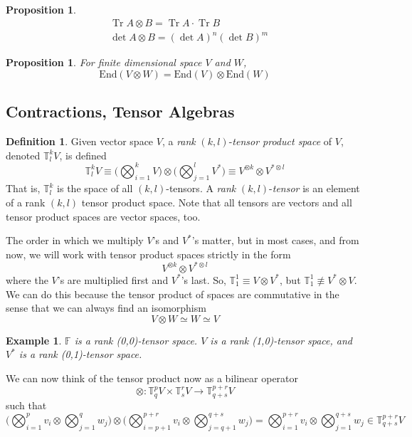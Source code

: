 \documentclass{article}
\DeclareMathOperator{\Tr}{Tr}
\newtheorem{proposition}[theorem]{Proposition}
\newtheorem{example}{Example}[section]
\theoremstyle{remark}
\theoremstyle{definition}
\newtheorem{definition}{Definition}[section]
\begin{document}
    \begin{proposition}
    \begin{align*}
        & \Tr{A \otimes B} = \Tr{A} \cdot \Tr{B} \\
        & \det{A \otimes B} = (\det{A})^n (\det{B})^m
    \end{align*}
    \end{proposition}

    \begin{proposition}
    For finite dimensional space $V$ and $W$, 
    \[\text{End}(V \otimes W) = \text{End}(V) \otimes \text{End}(W)\]
    \end{proposition}

  \subsection{Contractions, Tensor Algebras}

    \begin{definition}
    Given vector space $V$, a \textit{rank }$(k, l)$-\textit{tensor product space} of $V$, denoted $\mathbb{T}^{k}_{l} V$, is defined
    \[ \mathbb{T}^k_l V \equiv \bigg( \bigotimes_{i=1}^{k} V \bigg) \otimes \bigg( \bigotimes_{j=1}^{l} V^{*} \bigg) \equiv V^{\otimes k} \otimes V^{* \otimes l}\]
    That is, $\mathbb{T}^{k}_{l}$ is the space of all $(k, l)$-tensors. A \textit{rank }$(k, l)$-\textit{tensor} is an element of a rank $(k, l)$ tensor product space. Note that all tensors are vectors and all tensor product spaces are vector spaces, too. 

    The order in which we multiply $V$'s and $V^*$'s matter, but in most cases, and from now, we will work with tensor product spaces strictly in the form 
    \[ V^{\otimes k} \otimes V^{* \otimes l} \]
    where the $V$'s are multiplied first and $V^*$'s last. So, $\mathbb{T}^{1}_{1} \equiv V \otimes V^*$, but $\mathbb{T}^{1}_{1} \not\equiv V^* \otimes V$. We can do this because the tensor product of spaces are commutative in the sense that we can always find an isomorphism
    \[V \otimes W \simeq W \simeq V\]
    \end{definition}

    \begin{example}
    $\mathbb{F}$ is a rank (0,0)-tensor space. $V$ is a rank (1,0)-tensor space, and $V^{*}$ is a rank (0,1)-tensor space. 
    \end{example}

    We can now think of the tensor product now as a bilinear operator
    \[\otimes: \mathbb{T}^p_q V \times \mathbb{T}^r_s V \longrightarrow \mathbb{T}^{p+r}_{q+s} V\]
    such that
    \[\bigg( \bigotimes_{i=1}^p v_i \otimes \bigotimes_{j=1}^q w_j \bigg) \otimes \bigg( \bigotimes_{i = p+1}^{p+r} v_i \otimes \bigotimes_{j=q+1}^{q+s} w_j \bigg) = \bigotimes_{i=1}^{p+r} v_i \otimes \bigotimes_{j=1}^{q+s} w_j \in \mathbb{T}^{p+r}_{q+s} V\]
\end{document}
